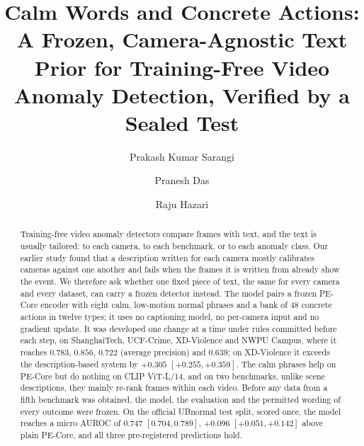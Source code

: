 \documentclass[a4paper,fleqn]{cas-sc}
\begin{document}
\let\WriteBookmarks\relax
\def\floatpagepagefraction{1}
\def\textpagefraction{.001}


\title[mode = title]{Calm Words and Concrete Actions: A Frozen, Camera-Agnostic Text
Prior for Training-Free Video Anomaly Detection, Verified by a Sealed Test}

\author[1]{Prakash Kumar Sarangi}


\author[1]{Pranesh Das}

\author[1]{Raju Hazari}

\begin{abstract}
Training-free video anomaly detectors compare frames with text, and the text is
usually tailored: to each camera, to each benchmark, or to each anomaly class. Our
earlier study found that a description written for each camera mostly calibrates
cameras against one another and fails when the frames it is written from already
show the event. We therefore ask whether one fixed piece of text, the same for every
camera and every dataset, can carry a frozen detector instead. The model pairs a
frozen PE-Core encoder with eight calm, low-motion normal phrases and a bank of 48
concrete actions in twelve types; it uses no captioning model, no per-camera input
and no gradient update. It was developed one change at a time under rules committed
before each step, on ShanghaiTech, UCF-Crime, XD-Violence and NWPU Campus, where it
reaches $0.783$, $0.856$, $0.722$ (average precision) and $0.639$; on XD-Violence it
exceeds the description-based system by $+0.305$ $[+0.255, +0.359]$. The calm phrases
help on PE-Core but do nothing on CLIP ViT-L/14, and on two benchmarks, unlike scene
descriptions, they mainly re-rank frames within each video. Before any data from a fifth benchmark was
obtained, the model, the evaluation and the permitted wording of every outcome were
frozen. On the official UBnormal test split, scored once, the model reaches a micro
AUROC of $0.747$ $[0.704, 0.789]$, $+0.096$ $[+0.051, +0.142]$ above plain PE-Core, and
all three pre-registered predictions hold.
\end{abstract}
\end{document}
